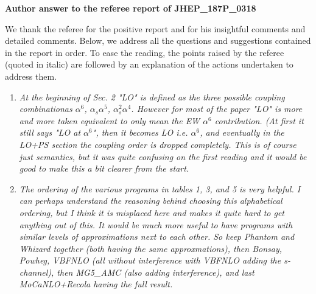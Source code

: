 \documentclass{report}
\begin{document}
\noindent

\begin{center}
  \LARGE \textbf{Author answer to the referee report of JHEP\_187P\_0318}
\end{center}
\vspace{0.5cm}
We thank the referee for the positive report and for his insightful comments and detailed comments. Below, we address all the questions and suggestions contained in the report in order. To ease the reading, the points raised by the referee (quoted in italic) are followed by an  explanation of the actions undertaken to address them. 

\vspace{0.5cm}
\begin{enumerate}

    \item \emph{At the beginning of Sec. 2 "LO" is defined as the three possible coupling
combinationas $\alpha^6$, $\alpha_s \alpha^5$, $\alpha_s^2 \alpha^4$. However for most of the paper "LO" is more 
and more taken equivalent to only mean the EW $\alpha^6$ contribution. (At first it still says "LO at $\alpha^6$", 
then it becomes
LO i.e. $\alpha^6$, and eventually in the LO+PS section the coupling order is dropped completely. 
This is of course just semantics, but it was quite confusing on the first reading and it would be good to make this a bit clearer from the start.}

    \item \emph{The ordering of the various programs in tables 1, 3, and 5 is very helpful.
I can perhaps understand the reasoning behind choosing this alphabetical
ordering, but I think it is misplaced here and makes it quite hard to get
anything out of this. It would be much more useful to have programs with similar levels of approximations next to each other. So keep Phantom and Whizard together (both having the same approxmations), then Bonsay, Powheg, VBFNLO (all without interference with VBFNLO adding the s-channel), then MG5\_AMC (also adding interference), and last MoCaNLO+Recola having the full result.}


\end{enumerate}
\end{document}
